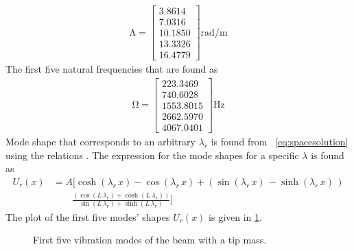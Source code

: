 \documentclass[]{report}
\begin{document}
\begin{align*}
\mathbf{\mathrm{\Lambda}}=\left[\begin{array}{c} 3.8614\\ 7.0316\\ 10.1850\\ 13.3326\\ 16.4779 \end{array}\right] \mathrm{rad/m}
\end{align*}
The first five natural frequencies that are found  as
\begin{align*}
\mathbf{\mathrm{\Omega}}=\left[\begin{array}{c} 223.3469\\ 740.6028\\ 1553.8015\\ 2662.5970\\ 4067.0401 \end{array}
\right] \mathrm{Hz}
\end{align*}
Mode shape that corresponds to an arbitrary $\lambda_r$ is found from ~\cref{eq:spacesolution} using the relations . The expression for the mode shapes for a specific $\lambda$ is found as
\begin{align*}
U_r\left(x\right)&= A\biggl[\cosh\!\left(\lambda_r\, x\right) - \cos\!\left(\lambda_r\, x\right) +\left(\sin\!\left(\lambda_r\, x\right)\,- \sinh\!\left(\lambda_r\, x\right)\,\right)\\&\quad \quad \frac{ \left(\cos\!\left(L\, \lambda_r\right) + \cosh\!\left(L\, \lambda_r\right)\right)}{\sin\!\left(L\, \lambda_r\right) + \sinh\!\left(L\, \lambda_r\right)}\biggr]
\end{align*}
The plot of the first five modes' shapes $U_r\left(x\right)$ is given in \cref{fig:cantileverallmodes}.
\begin{figure}[ht!]
\centering

\caption{First five vibration modes of the beam with a tip mass. }
\label{fig:cantileverallmodes}
\end{figure}
\newpage
\end{document}
